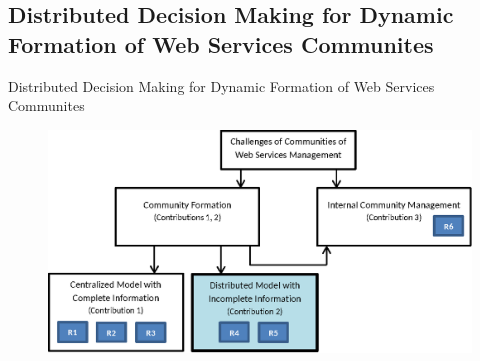 \documentclass{beamer}
\begin{document}
\subsection{Distributed Decision Making for Dynamic Formation of Web Services Communites}
\begin{frame}{Distributed Decision Making for Dynamic Formation of Web Services Communites}
    \begin{figure}[htbp]
        \centering
        \includegraphics[width=0.9 \columnwidth]{figures/model_c2.eps}
    \end{figure}
\end{frame}
\end{document}
